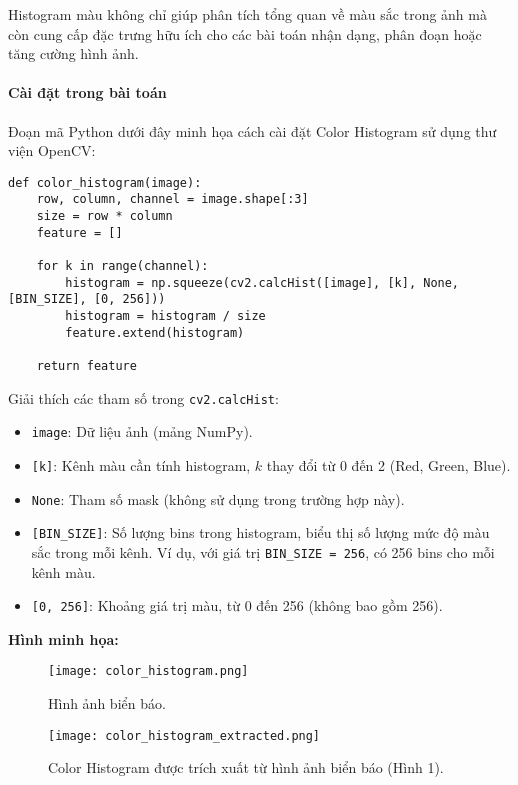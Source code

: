 \documentclass[a4paper,12pt]{article}
\begin{document}
\hspace{5mm}Histogram màu không chỉ giúp phân tích tổng quan về màu sắc trong ảnh mà còn cung cấp đặc trưng hữu ích cho các bài toán nhận dạng, phân đoạn hoặc tăng cường hình ảnh.  

\paragraph{Cài đặt trong bài toán}
\hspace{5mm}Đoạn mã Python dưới đây minh họa cách cài đặt Color Histogram sử dụng thư viện OpenCV:

\begin{verbatim}
def color_histogram(image):
    row, column, channel = image.shape[:3]
    size = row * column
    feature = []

    for k in range(channel):
        histogram = np.squeeze(cv2.calcHist([image], [k], None, [BIN_SIZE], [0, 256]))
        histogram = histogram / size
        feature.extend(histogram)

    return feature
\end{verbatim}

\noindent
Giải thích các tham số trong \texttt{cv2.calcHist}:
\begin{itemize}
    \item \texttt{image}: Dữ liệu ảnh (mảng NumPy).
    \item \texttt{[k]}: Kênh màu cần tính histogram, $k$ thay đổi từ 0 đến 2 (Red, Green, Blue).
    \item \texttt{None}: Tham số mask (không sử dụng trong trường hợp này).
    \item \texttt{[BIN\_SIZE]}: Số lượng bins trong histogram, biểu thị số lượng mức độ màu sắc trong mỗi kênh. Ví dụ, với giá trị \texttt{BIN\_SIZE = 256}, có 256 bins cho mỗi kênh màu.
    \item \texttt{[0, 256]}: Khoảng giá trị màu, từ 0 đến 256 (không bao gồm 256).
\end{itemize}

\vspace{0.5cm}

\noindent
\textbf{Hình minh họa:}
\begin{figure}[H]
    \centering
    \texttt{[image: color\_histogram.png]}
    \caption{Hình ảnh biển báo.}
    \label{fig:color_histogram1}
\end{figure}

\begin{figure}[H]
    \centering
    \texttt{[image: color\_histogram\_extracted.png]}
    \caption{Color Histogram được trích xuất từ hình ảnh biển báo (Hình 1).}
    \label{fig:color_histogram2}
\end{figure}
\end{document}
